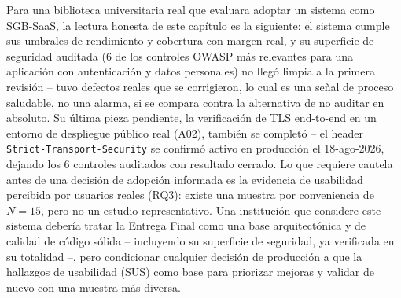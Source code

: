 Para una biblioteca universitaria real que evaluara adoptar un sistema
como SGB-SaaS, la lectura honesta de este capítulo es la siguiente: el
sistema cumple sus umbrales de rendimiento y cobertura con margen real, y
su superficie de seguridad auditada (6 de los controles OWASP más
relevantes para una aplicación con autenticación y datos personales) no
llegó limpia a la primera revisión -- tuvo defectos reales que se
corrigieron, lo cual es una señal de proceso saludable, no una alarma, si
se compara contra la alternativa de no auditar en absoluto. Su última
pieza pendiente, la verificación de TLS end-to-end en un entorno de
despliegue público real (A02), también se completó -- el header
\texttt{Strict-Transport-Security} se confirmó activo en producción el
18-ago-2026, dejando los 6 controles auditados con resultado cerrado. Lo
que requiere cautela antes de una decisión de adopción informada es la
evidencia de usabilidad percibida por usuarios reales (RQ3): existe una
muestra por conveniencia de $N=15$, pero no un estudio representativo.
Una institución que considere este sistema debería tratar
la Entrega Final como una base arquitectónica y de calidad de código
sólida -- incluyendo su superficie de seguridad, ya verificada en su
totalidad --, pero condicionar cualquier decisión de producción a que la
hallazgos de usabilidad (SUS) como base para priorizar mejoras y validar
de nuevo con una muestra más diversa.

